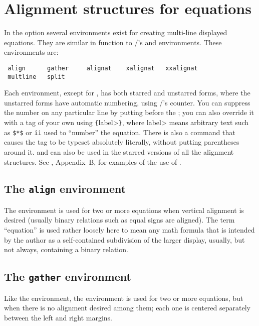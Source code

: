 \section{Alignment structures for equations}
\label{s:displays}

In the  option
several environments exist for creating multi-line displayed
equations.
They are similar in function to \latex/'s  and
 environments.
These environments are:
\begin{verbatim}
 align      gather     alignat    xalignat   xxalignat
 multline   split
\end{verbatim}
Each environment, except for , has both starred
and unstarred forms, where the unstarred forms have automatic
numbering, using \latex/'s  counter.  You can suppress
the number on any particular line by putting  before the
\cs\bslash; you can also override it with a tag of your own using
\verb"{"\<label>\verb"}", where \<label> means arbitrary text
such as \verb"$*$" or \verb"ii" used to ``number'' the equation.  There
is also a  command that causes the tag to be typeset
absolutely literally, without putting parentheses around it.  
and  can also be used in the starred versions of all the
 alignment structures.  See , Appendix~B,
for examples of the use of .

\subsection{The {\tt align} environment}

The  environment is used for two or more equations when
vertical alignment is desired (usually binary relations such as equal
signs are aligned).  The term ``equation'' is used rather loosely here
to mean any math formula that is intended by the author as a
self-contained subdivision of the larger display,  usually, but not
always, containing a binary relation.

\subsection{The {\tt gather} environment} Like the 
environment, the  environment is  used for two or more
equations, but when there is no alignment desired among them; each one
is centered separately between the left and right margins.

